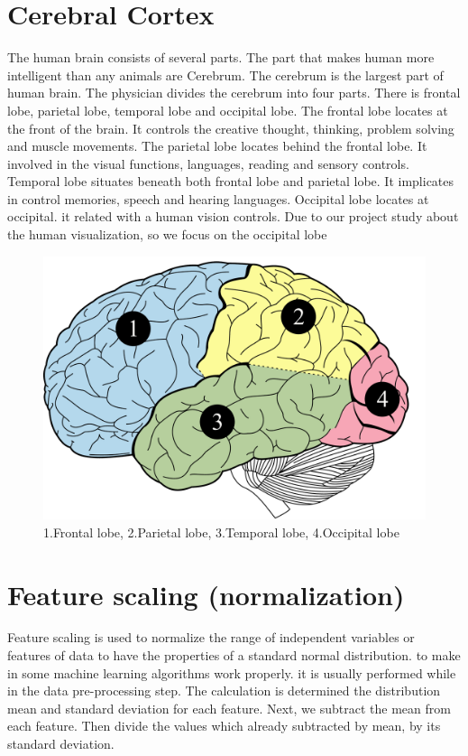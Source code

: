 \section{Cerebral Cortex}

\hspace{1.5cm} The human brain consists of several parts. The part that makes human more intelligent than any animals are Cerebrum. The cerebrum is the largest part of human brain. The physician divides the cerebrum into four parts. There is frontal lobe, parietal lobe, temporal lobe and occipital lobe. The frontal lobe locates at the front of the brain. It controls the creative thought, thinking, problem solving and muscle movements. The parietal lobe locates behind the frontal lobe. It involved in the visual functions, languages, reading and sensory controls. Temporal lobe situates beneath both frontal lobe and parietal lobe. It implicates in control memories, speech and hearing languages. Occipital lobe locates at occipital. it related with a human vision controls. Due to our project study about the human visualization, so we focus on the occipital lobe

\begin{figure}[ht]
	\centering
	\includegraphics[scale = 0.32]{chapter3/33.pdf}
	\caption{1.Frontal lobe, 2.Parietal lobe, 3.Temporal lobe, 4.Occipital lobe}
\end{figure}

\newpage
\section{Feature scaling (normalization)}

\hspace{1.5cm} Feature scaling is used to normalize the range of independent variables or features of data to have the properties of a standard normal distribution. to make in some machine learning algorithms work properly. it is usually performed while in the data pre-processing step. The calculation is determined the distribution mean and standard deviation for each feature. Next, we subtract the mean from each feature. Then divide the values which already subtracted by mean, by its standard deviation.\cite{ref10}

